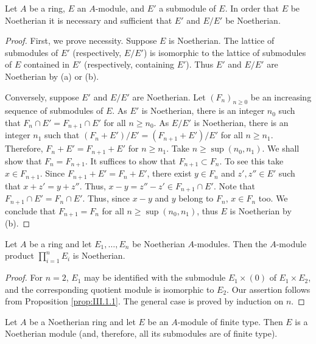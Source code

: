 \begin{proposition}
\label{prop:III.1.1}
Let $A$ be a ring, $E$ an $A$-module, and $E'$ a submodule of $E$. In order
that $E$ be Noetherian it is necessary and sufficient that $E'$ and $E/E'$
be Noetherian.
\end{proposition}

\begin{proof}
First, we prove necessity. Suppose $E$ is Noetherian. The lattice of
submodules of $E'$ (respectively, $E/E'$) is isomorphic to the lattice of
submodules of $E$ contained in $E'$ (respectively, containing $E'$). Thus
$E'$ and $E/E'$ are Noetherian by (a) or (b).

Conversely, suppose $E'$ and $E/E'$ are Noetherian. Let
$(F_{n})_{n\geq0}$ be an increasing sequence of submodules of $E$. As $E'$
is Noetherian, there is an integer $n_{0}$ such that
$F_{n}\cap E'=F_{n+1}\cap E'$ for all $n\geq n_{0}$. As $E/E'$ is
Noetherian, there is an integer $n_{1}$ such that
$(F_{n}+E')/E'=(F_{n+1}+E')/E'$ for all $n\geq n_{1}$. Therefore,
$F_{n}+E'=F_{n+1}+E'$ for $n\geq n_{1}$. Take $n\geq\sup(n_{0},n_{1})$. We
shall show that $F_{n}=F_{n+1}$. It suffices to show that
$F_{n+1}\subset F_{n}$. To see this take $x\in F_{n+1}$. Since
$F_{n+1}+E'=F_{n}+E'$, there exist $y\in F_{n}$ and $z',z''\in E'$ such
that $x+z'=y+z''$. Thus,
$x-y=z''-z'\in F_{n+1}\cap E'$. Note that
$F_{n+1}\cap E'=F_{n}\cap E'$. Thus, since $x-y$ and $y$ belong to $F_{n}$,
$x\in F_{n}$ too. We conclude that $F_{n+1}=F_{n}$ for all
$n\geq\sup(n_{0},n_{1})$, thus $E$ is Noetherian by (b).
\end{proof}

\begin{corollary}
\label{cor:III.1.1}
Let $A$ be a ring and let $E_{1},\ldots,E_{n}$ be Noetherian $A$-modules.
Then the $A$-module product $\prod_{i=1}^{n}E_{i}$ is Noetherian.
\end{corollary}

\begin{proof}
For $n=2$, $E_{1}$ may be identified with the submodule $E_{1}\times(0)$ of
$E_{1}\times E_{2}$, and the corresponding quotient module is isomorphic to
$E_{2}$. Our assertion follows from Proposition \ref{prop:III.1.1}. The
general case is proved by induction on $n$.
\end{proof}

\begin{corollary}
\label{cor:III.1.2}
Let $A$ be a Noetherian ring and let $E$ be an $A$-module of finite type.
Then $E$ is a Noetherian module (and, therefore, all its submodules are of
finite type).
\end{corollary}

